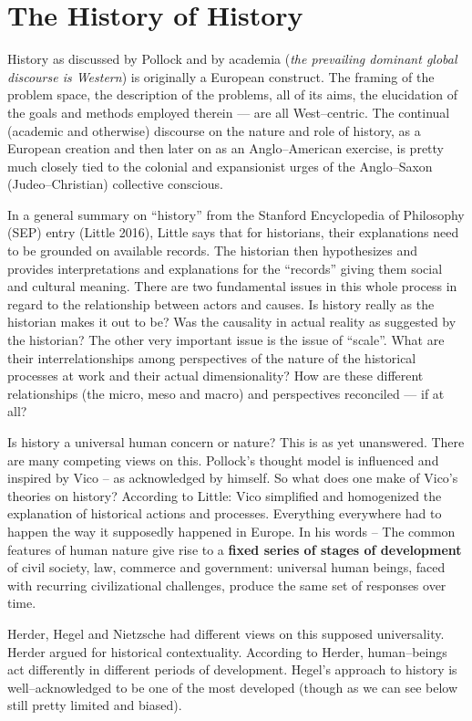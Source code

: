 \section*{The History of History}

History as discussed by Pollock and by academia (\textit{the prevailing dominant global discourse is Western}) is originally a European construct. The framing of the problem space, the description of the problems, all of its aims, the elucidation of the goals and methods employed therein — are all West–centric. The continual (academic and otherwise) discourse on the nature and role of history, as a European creation and then later on as an Anglo–American exercise, is pretty much closely tied to the colonial and expansionist urges of the Anglo–Saxon (Judeo–Christian) collective conscious.

In a general summary on “history” from the Stanford Encyclopedia of Philosophy (SEP) entry (Little 2016), Little says that for historians, their explanations need to be grounded on available records. The historian then hypothesizes and provides interpretations and explanations for the “records” giving them social and cultural meaning. There are two fundamental issues in this whole process in regard to the relationship between actors and causes. Is history really as the historian makes it out to be? Was the causality in actual reality as suggested by the historian? The other very important issue is the issue of “scale”. What are their interrelationships among perspectives of the nature of the historical processes at work and their actual dimensionality? How are these different relationships (the micro, meso and macro) and perspectives reconciled — if at all?

Is history a universal human concern or nature? This is as yet unanswered. There are many competing views on this. Pollock’s thought model is influenced and inspired by Vico – as acknowledged by himself. So what does one make of Vico’s theories on history? According to Little: Vico simplified and homogenized the explanation of historical actions and processes. Everything everywhere had to happen the way it supposedly happened in Europe. In his words – The common features of human nature give rise to a \textbf{fixed series of stages of development} of civil society, law, commerce and government: universal human beings, faced with recurring civilizational challenges, produce the same set of responses over time.

Herder, Hegel and Nietzsche had different views on this supposed universality. Herder argued for historical contextuality. According to Herder, human–beings act differently in different periods of development. Hegel's approach to history is well–acknowledged to be one of the most developed (though as we can see below still pretty limited and biased).

